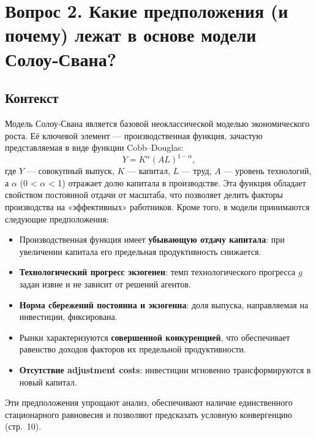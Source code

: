 \section*{Вопрос 2. Какие предположения (и почему) лежат в основе модели Солоу‑Свана?}

\subsection*{Контекст}
Модель Солоу‑Свана является базовой неоклассической моделью экономического роста. Её ключевой элемент — производственная функция, 
зачастую представляемая в виде функции Cobb–Douglas:
\[
Y = K^\alpha (AL)^{1-\alpha},
\]
где \(Y\) — совокупный выпуск, \(K\) — капитал, \(L\) — труд, \(A\) — уровень технологий, а \(\alpha\) (0 < \(\alpha\) < 1) отражает долю 
капитала в производстве. Эта функция обладает свойством постоянной отдачи от масштаба, что позволяет делить факторы производства на 
«эффективных» работников. Кроме того, в модели принимаются следующие предположения:
\begin{itemize}
  \item Производственная функция имеет \textbf{убывающую отдачу капитала}: при увеличении капитала его предельная продуктивность снижается.
  \item \textbf{Технологический прогресс экзогенен}: темп технологического прогресса \(g\) задан извне и не зависит от решений агентов.
  \item \textbf{Норма сбережений постоянна и экзогенна}: доля выпуска, направляемая на инвестиции, фиксирована.
  \item Рынки характеризуются \textbf{совершенной конкуренцией}, что обеспечивает равенство доходов факторов их предельной продуктивности.
  \item \textbf{Отсутствие adjustment costs}: инвестиции мгновенно трансформируются в новый капитал.
\end{itemize}
Эти предположения упрощают анализ, обеспечивают наличие единственного стационарного равновесия и позволяют предсказать условную конвергенцию 
(стр.~10).

